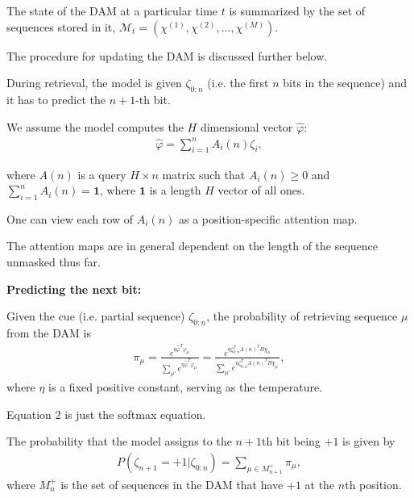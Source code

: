 \documentclass{article}
\theoremstyle{plain}
\theoremstyle{definition}
\theoremstyle{remark}
\begin{document}

The state of the DAM at a particular time $t$ is summarized by the set of sequences stored in it, $\mathcal{M}_t = (\chi^{(1)},\chi^{(2)},\dots,\chi^{(M)})$. 


The procedure for updating the DAM is discussed further below. 

During retrieval, the model is given $\zeta_{0:n}$ (i.e. the first $n$ bits in the sequence) and it has to predict the $n+1$-th bit.

We assume the model computes the $H$ dimensional vector $\hat{\varphi}$:
\begin{align}
\hat{\varphi} = \sum_{i=1}^n A_{i}(n) \zeta_i,
\end{align}

where $A(n)$ is a query $H \times n$ matrix such that $A_i(n) \ge 0$ and $\sum_{i = 1}^n A_i(n) = \bm{1}$, 
where $\bm{1}$ is a length $H$ vector of all ones. 

One can view each row of $A_i(n)$ as a position-specific attention map.  



The attention maps are in general dependent on the length of the sequence unmasked thus far. 

\textbf{Predicting the next bit:} 

Given the cue (i.e. partial sequence) $\zeta_{0:n}$, the probability of retrieving sequence $\mu$ from the DAM is 
\begin{align}
\pi_{\mu} = \frac{e^{\eta \hat{\varphi}^T \varphi_{\mu} }}{\sum_{\mu'} e^{\eta \hat{\varphi}^T \varphi_{\mu'} }} = \frac{e^{\eta \zeta_{0:n}^T A(n)^T B \chi_{\mu} }}{\sum_{\mu'} e^{\eta \zeta_{0:n}^T A(n)^T B \chi_{\mu'}  }},
\end{align}
where $\eta$ is a fixed positive constant, serving as the temperature.

Equation 2 is just the softmax equation.

The probability that the model assigns to the $n+1$th bit being $+1$ is given by
\begin{align}
P(\zeta_{n+1}= +1 | \zeta_{0:n}) = \sum_{\mu \in M_{n+1}^{+}} \pi_{\mu},
\end{align}
where $M_n^{+}$ is the set of sequences in the DAM that have $+1$ at the $n$th position. 
\end{document}

